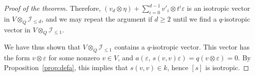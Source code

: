 \documentclass{amsart}
\newcommand{\calI}{\mathcal{I}}
\theoremstyle{remark}
\begin{document}
\begin{proof}[Proof of the theorem]
  Therefore, $(v_d\otimes\eta) +
  \sum_{i=0}^{d-1} v'_i\otimes t^i\varepsilon$ is an isotropic vector
  in $V\otimes_Q\calI_{\leq d}$, 
  and we may repeat the argument if $d\geq2$ until we find a
  $q$-isotropic vector in $V\otimes_Q\calI_{\leq1}$.

  We have thus shown that $V\otimes_Q\calI_{\leq1}$ contains a
  $q$-isotropic vector. This vector has the form
  $v\otimes\varepsilon$ for some nonzero $v\in V$, and
  $a(\varepsilon,\, s(v,v)\varepsilon)=q(v\otimes\varepsilon) = 0$.
  By Proposition~\ref{prop:defa}, this implies that $s(v,v)\in k$,
  hence $[s]$ is isotropic. 
\end{proof}



\end{document}
